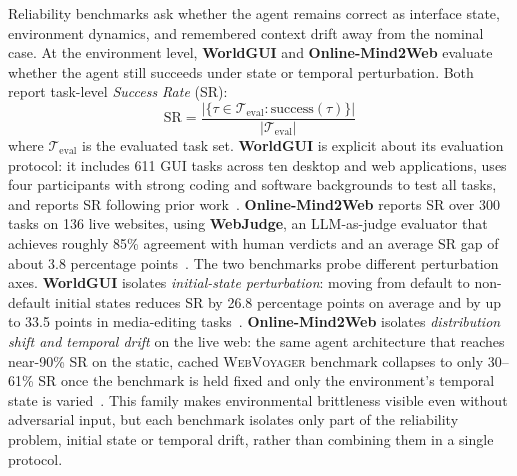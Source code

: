 
Reliability benchmarks ask whether the agent remains correct as interface state, environment dynamics, and remembered context drift away from the nominal case. At the environment level, \textbf{WorldGUI} and \textbf{Online-Mind2Web} evaluate whether the agent still succeeds under state or temporal perturbation. Both report task-level \emph{Success Rate} (SR):
\begin{equation}
\mathrm{SR} = \frac{|\{\tau \in \mathcal{T}_{\mathrm{eval}} : \mathrm{success}(\tau)\}|}{|\mathcal{T}_{\mathrm{eval}}|}
\label{eq:sr}
\end{equation}
where $\mathcal{T}_{\mathrm{eval}}$ is the evaluated task set. \textbf{WorldGUI} is explicit about its evaluation protocol: it includes 611 GUI tasks across ten desktop and web applications, uses four participants with strong coding and software backgrounds to test all tasks, and reports SR following prior work~\cite{worldgui2025}. \textbf{Online-Mind2Web} reports SR over 300 tasks on 136 live websites, using \textbf{WebJudge}, an LLM-as-judge evaluator that achieves roughly 85\% agreement with human verdicts and an average SR gap of about 3.8 percentage points~\cite{onlinemind2web2025}. The two benchmarks probe different perturbation axes. \textbf{WorldGUI} isolates \emph{initial-state perturbation}: moving from default to non-default initial states reduces SR by 26.8 percentage points on average and by up to 33.5 points in media-editing tasks~\cite{worldgui2025}. \textbf{Online-Mind2Web} isolates \emph{distribution shift and temporal drift} on the live web: the same agent architecture that reaches near-90\% SR on the static, cached \textsc{WebVoyager} benchmark collapses to only 30--61\% SR once the benchmark is held fixed and only the environment's temporal state is varied~\cite{onlinemind2web2025}. This family makes environmental brittleness visible even without adversarial input, but each benchmark isolates only part of the reliability problem, initial state or temporal drift, rather than combining them in a single protocol.

